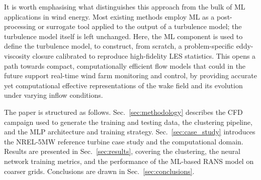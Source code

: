 It is worth emphasising what distinguishes this approach from the bulk of ML applications in wind energy. Most existing methods employ ML as a post-processing or surrogate tool applied to the output of a turbulence model; the turbulence model itself is left unchanged. Here, the ML component is used to define the turbulence model, to construct, from scratch, a problem-specific eddy-viscosity closure calibrated to reproduce high-fidelity LES statistics. This opens a path towards compact, computationally efficient flow models that could in the future support real-time wind farm monitoring and control, by providing accurate yet computational effective representations of the wake field and its evolution under varying inflow conditions.

The paper is structured as follows. Sec.~\ref{sec:methodology} describes the CFD campaign used to generate the training and testing data, the clustering pipeline, and the MLP architecture and training strategy. Sec.~\ref{sec:case_study} introduces the NREL-5MW reference turbine case study and the computational domain. Results are presented in Sec.~\ref{sec:results}, covering the clustering, the neural network training metrics, and the performance of the ML-based RANS model on coarser grids. Conclusions are drawn in Sec.~\ref{sec:conclusions}.
